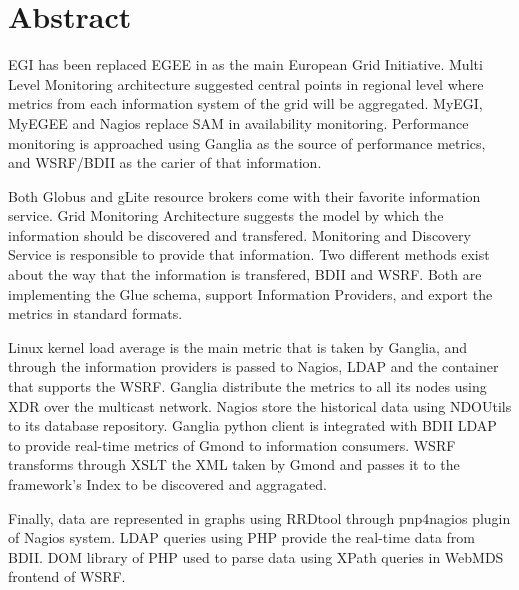 \section*{Abstract}

EGI has been replaced EGEE in as the main European Grid Initiative. Multi Level Monitoring architecture suggested central points in regional level where metrics from each information system of the grid will be aggregated. MyEGI, MyEGEE and Nagios replace SAM in availability monitoring. Performance monitoring is approached using Ganglia as the source of performance metrics, and WSRF/BDII as the carier of that information.

Both Globus and gLite resource brokers come with their favorite information service. Grid Monitoring Architecture suggests the model by which the information should be discovered and transfered. Monitoring and Discovery Service is responsible to provide that information. Two different methods exist about the way that the information is transfered, BDII and WSRF. Both are implementing the Glue schema, support Information Providers, and export the metrics in standard formats.

Linux kernel load average is the main metric that is taken by Ganglia, and through the information providers is passed to Nagios, LDAP and the container that supports the WSRF. Ganglia distribute the metrics to all its nodes using XDR over the multicast network. Nagios store the historical data using NDOUtils to its database repository. Ganglia python client is integrated with BDII LDAP to provide real-time metrics of Gmond to information consumers. WSRF transforms through XSLT the XML taken by Gmond and passes it to the framework's Index to be discovered and aggragated.

Finally, data are represented in graphs using RRDtool through pnp4nagios plugin of Nagios system. LDAP queries using PHP provide the real-time data from BDII. DOM library of PHP used to parse data using XPath queries in WebMDS frontend of WSRF.

\newpage
